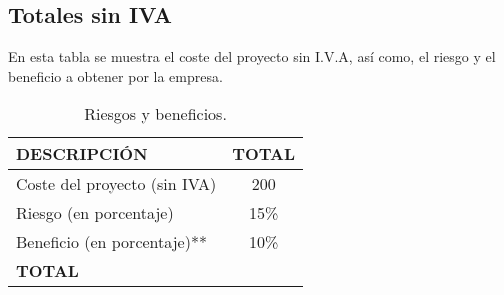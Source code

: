 \documentclass[10pt,a4paper,oldfontcommands]{dpds}
\begin{document}
\subsection{Totales sin IVA}
En esta tabla se muestra el coste del proyecto sin I.V.A, así como, el riesgo y el beneficio a obtener por la empresa.
\begin{table}[H]
\begin{center}
\begin{tabular}{l c}
\hline
\textbf{DESCRIPCIÓN} & \textbf{TOTAL}\\ \hline \hline
Coste del proyecto (sin IVA) & 200\\
Riesgo (en porcentaje) & 15\% \\
Beneficio (en porcentaje)** & 10\% \\ \hline \hline
\textbf{TOTAL} & \\ \hline
\end{tabular}
\caption{Riesgos y beneficios.}
\label{tab:total}
\end{center}
\end{table}
\end{document}
